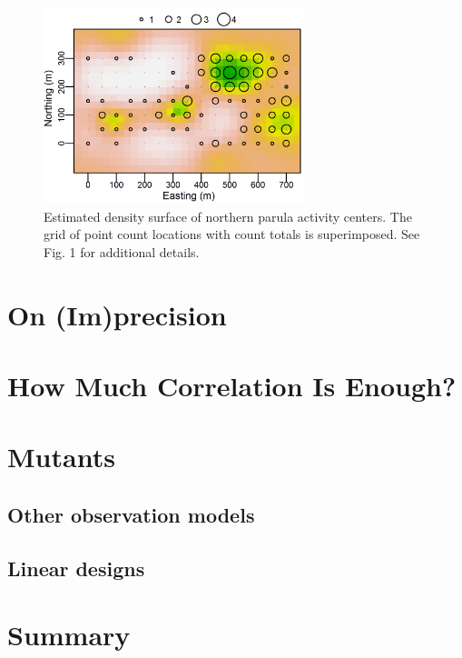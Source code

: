 \begin{figure}
  \centering
  \includegraphics[width=3in,height=2.25in]{Ch14/figs/nopaDen}
  \caption{Estimated density surface of northern parula activity
    centers. The grid of point count locations with count totals is
    superimposed. See Fig. 1 for additional details.  }
  \label{fig:nopaDen}
\end{figure}




\section{On (Im)precision}





\section{How Much Correlation Is Enough?}



\section{Mutants}

\subsection{Other observation models}

\subsection{Linear designs}




\section{Summary}









